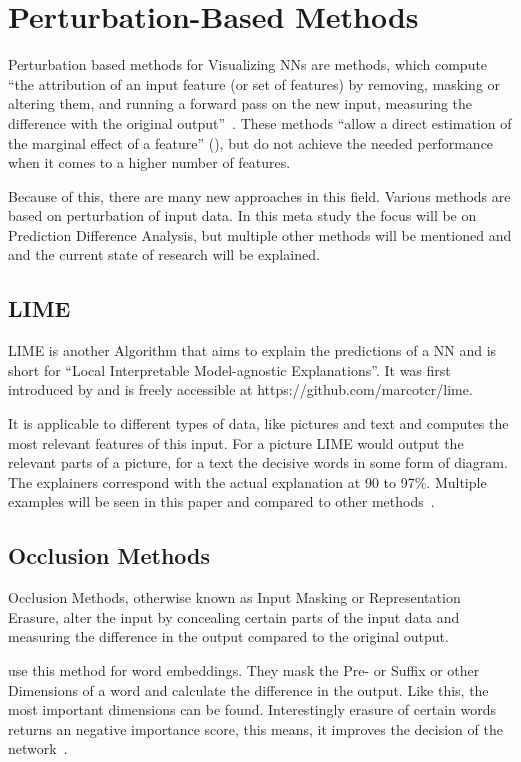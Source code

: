 \section{Perturbation-Based Methods}
Perturbation based methods for Visualizing NNs are methods, which compute “the attribution of an input feature (or set of features) by removing, masking or altering them, and running a forward pass on the new input, measuring the difference with the original output”~\cite[2]{Acona.2018}.
These methods “allow a direct estimation of the marginal effect of a feature” (\cite[2]{Acona.2018}), but do not achieve the needed performance when it comes to a higher number of features.
\par
Because of this, there are many new approaches in this field.
Various methods are based on perturbation of input data. In this meta study the focus will be on Prediction Difference Analysis, but multiple other methods will be mentioned and and the current state of research will be explained.


\subsection{LIME}\label{subsect:lime}
LIME is another Algorithm that aims to explain the predictions of a NN and is short for “Local Interpretable Model-agnostic Explanations”. It was first introduced by  and is freely accessible at https://github.com/marcotcr/lime.
\par
It is applicable to different types of data, like pictures and text and computes the most relevant features of this input. For a picture LIME would output the relevant parts of a picture, for a text the decisive words in some form of diagram. The explainers correspond with the actual explanation at 90 to 97\%. Multiple examples will be seen in this paper and compared to other methods~\cite{Ribeiro.2016}.

\subsection{Occlusion Methods}
Occlusion Methods, otherwise known as Input Masking or Representation Erasure, alter the input by concealing certain parts of the input data and measuring the difference in the output compared to the original output. 
\par
{} use this method for word embeddings. They mask the Pre- or Suffix or other Dimensions of a word and calculate the difference in the output. Like this, the most important dimensions can be found. Interestingly erasure of certain words returns an negative importance score, this means, it improves the decision of the network~\cite{Li.2016}.

